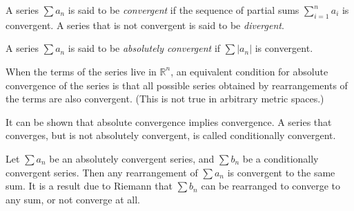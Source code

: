 \documentclass{article}
\def\R{\mathbb{R}}
\begin{document}
A series $\sum a_n$ is said to be \emph{convergent}
if the sequence of partial sums $\sum_{i=1}^n a_i$ is convergent.
A series that is not convergent is said to be \emph{divergent}.

A series $\sum a_n$ is said to be \emph{absolutely convergent}
if $\sum |a_n|$ is convergent.

When the terms of the series live in $\R^n$,
an equivalent condition for absolute convergence of the series
is that all possible series obtained by rearrangements
of the terms are also convergent.
(This is not true in arbitrary metric spaces.)

It can be shown that absolute convergence implies convergence.
A series that converges, but is not absolutely convergent,
is called conditionally convergent.

Let $\sum a_n$ be an absolutely convergent series,
and $\sum b_n$ be a conditionally convergent series.
Then any rearrangement of $\sum a_n$ is convergent to the same sum.
It is a result due to Riemann that $\sum b_n$
can be rearranged to converge to any sum, or not converge at all.
\end{document}
